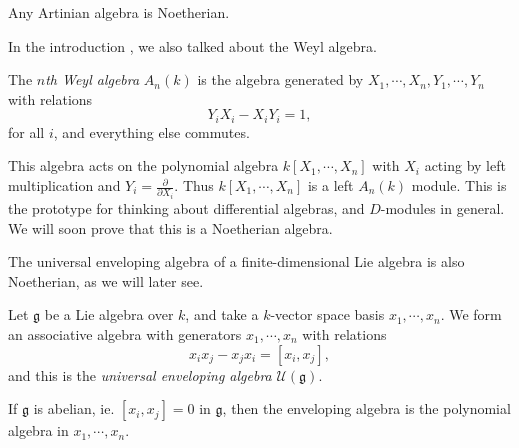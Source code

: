 \documentclass[a4paper]{article}
\begin{document}
\begin{eg}
  Any Artinian algebra is Noetherian.
\end{eg}

In the introduction , we also talked about the Weyl algebra.

\begin{defi}
  The \emph{$n$th Weyl algebra} $A_n(k)$ is the algebra generated by $X_1, \cdots, X_n, Y_1, \cdots, Y_n$ with relations
  \[
    Y_i X_i - X_i Y_i = 1,
  \]
  for all $i$, and everything else commutes.
\end{defi}

This algebra acts on the polynomial algebra $k[X_1, \cdots, X_n]$ with $X_i$ acting by left multiplication and $Y_i = \frac{\partial}{\partial X_i}$. Thus $k[X_1, \cdots, X_n]$ is a left $A_n(k)$ module. This is the prototype for thinking about differential algebras, and $D$-modules in general. We will soon prove that this is a Noetherian algebra.

The universal enveloping algebra of a finite-dimensional Lie algebra is also Noetherian, as we will later see.
\begin{defi}
  Let $\mathfrak{g}$ be a Lie algebra over $k$, and take a $k$-vector space basis $x_1, \cdots, x_n$. We form an associative algebra with generators $x_1, \cdots, x_n$ with relations
  \[
    x_i x_j - x_j x_i = [x_i, x_j],
  \]
  and this is the \emph{universal enveloping algebra} $\mathcal{U}(\mathfrak{g})$.
\end{defi}

\begin{eg}
  If $\mathfrak{g}$ is abelian, ie. $[x_i, x_j] = 0$ in $\mathfrak{g}$, then the enveloping algebra is the polynomial algebra in $x_1, \cdots, x_n$.
\end{eg}
\end{document}
